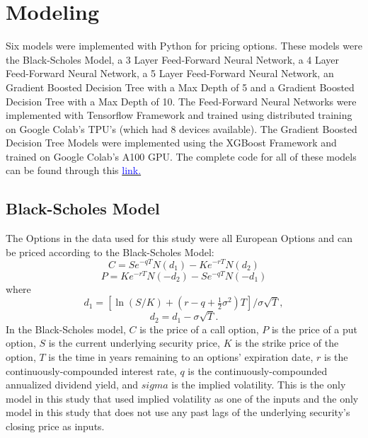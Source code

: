 \documentclass[a4paper]{article}
\begin{document}
\section{Modeling}
Six models were implemented with Python for pricing options. These models were the Black-Scholes Model, a 3 Layer Feed-Forward Neural Network, a 4 Layer Feed-Forward Neural Network, a 5 Layer Feed-Forward Neural Network, an Gradient Boosted Decision Tree with a Max Depth of 5 and a Gradient Boosted Decision Tree with a Max Depth of 10. The Feed-Forward Neural Networks were implemented with Tensorflow Framework and trained using distributed training on Google Colab's TPU's (which had 8 devices available). The Gradient Boosted Decision Tree Models were implemented using the XGBoost Framework and trained on Google Colab's A100 GPU. The complete code for all of these models can be found through this \href{https://github.com/juan-esteban-berger/Options_Pricing_with_Neural_Networks_and_Gradient_Boosters/blob/main/03_Modeling.ipynb}{\textcolor{blue}{link.}}
\subsection{Black-Scholes Model}
The Options in the data used for this study were all European Options and can be priced according to the Black-Scholes Model:
$$
C = Se^{-qT}N(d_1)-Ke^{-rT}N(d_2)
$$
$$
P = Ke^{-rT}N(-d_2)-Se^{-qT}N(-d_1)
$$
where
$$
d_1 = [\ln(S/K) + (r - q + \tfrac{1}{2}\sigma^2)T] / \sigma\sqrt{T},
$$
$$
d_2 = d_1 - \sigma\sqrt{T}.
$$
In the Black-Scholes model, $C$ is the price of a call option, $P$ is the price of a put option, $S$ is the current underlying security price, $K$ is the strike price of the option, $T$ is the time in years remaining to an options' expiration date, $r$ is the continuously-compounded interest rate, $q$ is the continuously-compounded annualized dividend yield, and $sigma$ is the implied volatility. This is the only model in this study that used implied volatility as one of the inputs and the only model in this study that does not use any past lags of the underlying security's closing price as inputs.
\end{document}
